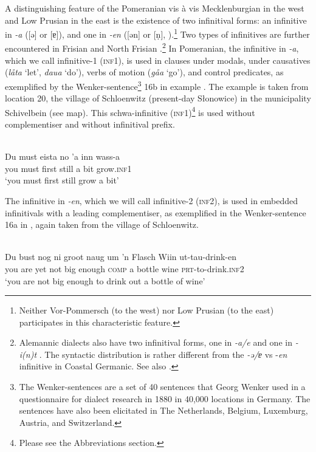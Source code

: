 \documentclass[output=paper,hidelinks,draftmode]{langscibook}
\begin{document}
A distinguishing feature of the Pomeranian vis à vis Mecklenburgian in the west and Low Prusian in the east is the existence of two infinitival forms: an infinitive in \textit{{}-a} ([ə] or [ɐ]), and one in \textit{{}-en} ([ən] or [ṇ], \citealt[295]{Wrede1895}).\footnote{Neither Vor-Pommersch (to the west) nor Low Prusian (to the east) participates in this characteristic feature.} Two types of infinitives are further encountered in Frisian and North Frisian \citep[4--5]{Hoekstra1997}.\footnote{Alemannic dialects also have two infinitival forms, one in \textit{{}-a/e} and one in \textit{{}-i(n)t} \citep{BayerBrandner2004}. The syntactic distribution is rather different from the \textit{{}-ə/ɐ} vs -\textit{en} infinitive in Coastal Germanic. See also \citet{Höhle2006}.} In Pomeranian, the infinitive in \textit{{}-a}, which we call infinitive-1 (\textsc{inf1}), is used in clauses under modals, under causatives (\textit{låta} `let', \textit{daua} `do'), verbs of motion (\textit{gåa} `go'), and control predicates, as exemplified by the Wenker-sentence\footnote{The Wenker-sentences are a set of 40 sentences that Georg Wenker used in a questionnaire for dialect research in 1880 in 40,000 locations in Germany. The sentences have also been elicitated in The Netherlands, Belgium, Luxemburg, Austria, and Switzerland.} 16b in example . The example is taken from location 20, the village of Schloenwitz (present-day Słonowice) in the municipality Schivelbein (see map). This schwa-infinitive (\textsc{inf1})\footnote{Please see the Abbreviations section.} is used without complementiser and without infinitival prefix.


\ea\label{ex:postma:1}
 \\
\gll Du must eista no {'a} inn wass-a\\
     you must first still a bit grow.\textsc{inf1}\\
\glt `you must first still grow a bit'\z

The infinitive in \textit{{}-en}, which we will call infinitive-2 (\textsc{inf2}), is used in embedded infinitivals with a leading complementiser, as exemplified in the Wenker-sentence 16a in , again taken from the village of Schloenwitz.

\ea\label{ex:postma:2}

 \\
\gll Du bust nog ni groot naug um {'n} Flasch Wiin ut-tau-drink-en\\
     you are yet not big enough \textsc{comp} a bottle wine \textsc{prt}{}-to-drink.\textsc{inf2}\\
\glt {}`you are not big enough to drink out a bottle of wine' \z
\end{document}
